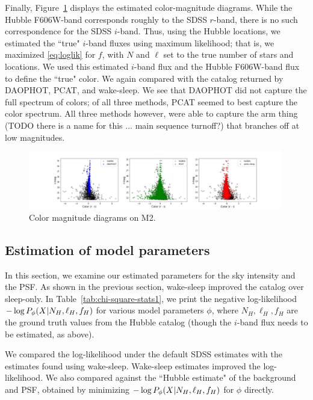 Finally, Figure~\ref{fig:cmd_m2} displays the estimated color-magnitude diagrams. While the Hubble F606W-band corresponds roughly to the SDSS $r$-band, there is no such correspondence for the SDSS $i$-band. Thus, using the Hubble locations, we estimated the ``true" $i$-band fluxes using maximum likelihood; that is, we maximized \eqref{eq:loglik}
for $f$, with $N$ and $\ell$ set to the true number of stars and locations. We used this estimated $i$-band flux and the Hubble F606W-band flux to define the ``true" color. We again compared with the catalog returned by DAOPHOT, PCAT, and wake-sleep. We see that DAOPHOT did not capture the full spectrum of colors; of all three methods, PCAT seemed to best capture the color spectrum. All three methods however, were able to capture the arm thing (TODO there is a name for this ... main sequence turnoff?) that branches off at low magnitudes. 

\begin{figure}[h]
    \centering
    \includegraphics[width=0.99\textwidth]{figures/cmd.png}
    \caption{Color magnitude diagrams on M2. }
    \label{fig:cmd_m2}
\end{figure}


\subsection{Estimation of model parameters}
\label{sec:results_model_params}
In this section, we examine our estimated parameters 
for the sky intensity and the PSF. As shown in the previous section, wake-sleep improved the catalog over sleep-only. In Table~\ref{tab:chi-square-stats1}, we
print the negative log-likelihood $- \log P_\phi(X | N_{H}, \ell_{H}, f_{H})$ for various model parameters $\phi$, where $N_{H}, \ell_{H}, f_{H}$ are the ground truth
values from the Hubble catalog (though the $i$-band flux needs to be estimated, as above). 

We compared the log-likelihood under the default SDSS estimates with the estimates found using wake-sleep. Wake-sleep estimates improved the log-likelihood. We also compared against the ``Hubble estimate" of the background and PSF, obtained by minimizing 
$- \log P_\phi(X | N_{H}, \ell_{H}, f_{H})$ for $\phi$ directly. 

